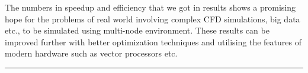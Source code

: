 The numbers in speedup and efficiency that we got in results shows a promising hope for the problems of real world involving complex CFD simulations, big data etc., to be simulated using multi-node environment. These results can be improved further with better optimization techniques and utilising the features of modern hardware such as vector processors etc. 
\begin{center}
    \rule{3cm}{1pt}
\end{center}